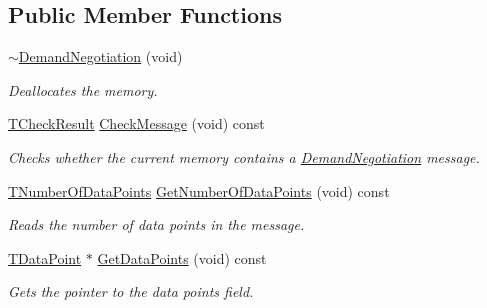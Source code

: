 \subsection*{Public Member Functions}
\begin{DoxyCompactItemize}
\item 
\hyperlink{class_terra_swarm_1_1_synchronous_1_1_demand_negotiation_a305449b096b0a75cc403222653b241a4}{$\sim$\-Demand\-Negotiation} (void)
\begin{DoxyCompactList}\small\item\em Deallocates the memory. \end{DoxyCompactList}\item 
\hyperlink{class_terra_swarm_1_1_synchronous_1_1_demand_negotiation_abf70719cd7b70d3eeecb1949bc2157a3}{T\-Check\-Result} \hyperlink{class_terra_swarm_1_1_synchronous_1_1_demand_negotiation_a1ebc766e094f58150ff5d1fa78031294}{Check\-Message} (void) const 
\begin{DoxyCompactList}\small\item\em Checks whether the current memory contains a \hyperlink{class_terra_swarm_1_1_synchronous_1_1_demand_negotiation}{Demand\-Negotiation} message. \end{DoxyCompactList}\item 
\hyperlink{class_terra_swarm_1_1_synchronous_1_1_demand_negotiation_aeaaae7fc1861d9af2bff4c9dcb4d89ac}{T\-Number\-Of\-Data\-Points} \hyperlink{class_terra_swarm_1_1_synchronous_1_1_demand_negotiation_af0694c36ab00a1dadf8bb8f1b3c7c159}{Get\-Number\-Of\-Data\-Points} (void) const 
\begin{DoxyCompactList}\small\item\em Reads the number of data points in the message. \end{DoxyCompactList}\item 
\hyperlink{class_terra_swarm_1_1_synchronous_1_1_demand_negotiation_a6660353fa0a65775070bba8571a76e3d}{T\-Data\-Point} $\ast$ \hyperlink{class_terra_swarm_1_1_synchronous_1_1_demand_negotiation_ab99ce665f0822299184ff34cf5e674d2}{Get\-Data\-Points} (void) const 
\begin{DoxyCompactList}\small\item\em Gets the pointer to the data points field. \end{DoxyCompactList}\end{DoxyCompactItemize}
